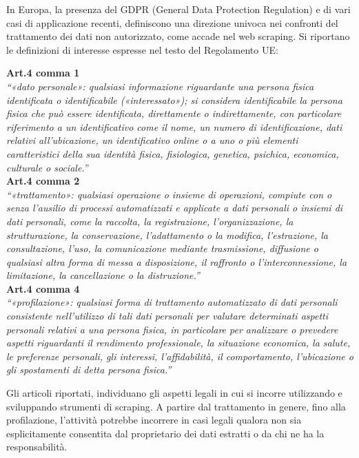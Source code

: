 In Europa, la presenza del GDPR (General Data Protection Regulation)\cite{GDPR} e di vari casi di applicazione recenti, definiscono una direzione univoca nei confronti del trattamento dei dati non autorizzato, come accade nel web scraping.
Si riportano le definizioni di interesse espresse nel testo del Regolamento UE:
\begin{center}
\textbf{Art.4 comma 1}\\
\textit{``«dato personale»: qualsiasi informazione riguardante una persona fisica identificata o
identificabile («interessato»); si considera identificabile la persona fisica che può essere
identificata, direttamente o indirettamente, con particolare riferimento a un identificativo come il
nome, un numero di identificazione, dati relativi all'ubicazione, un identificativo online o a uno o
più elementi caratteristici della sua identità fisica, fisiologica, genetica, psichica, economica,
culturale o sociale.''}\\
\newpage
\textbf{Art.4 comma 2 }\\
\textit{``«trattamento»: qualsiasi operazione o insieme di operazioni, compiute con o senza l'ausilio di
processi automatizzati e applicate a dati personali o insiemi di dati personali, come la raccolta, la
registrazione, l'organizzazione, la strutturazione, la conservazione, l'adattamento o la modifica,
l'estrazione, la consultazione, l'uso, la comunicazione mediante trasmissione, diffusione o qualsiasi
altra forma di messa a disposizione, il raffronto o l'interconnessione, la limitazione, la cancellazione
o la distruzione.''}\\

\textbf{Art.4 comma 4}\\
\textit{``«profilazione»: qualsiasi forma di trattamento automatizzato di dati personali consistente
nell'utilizzo di tali dati personali per valutare determinati aspetti personali relativi a una persona
fisica, in particolare per analizzare o prevedere aspetti riguardanti il rendimento professionale, la
situazione economica, la salute, le preferenze personali, gli interessi, l'affidabilità, il
comportamento, l'ubicazione o gli spostamenti di detta persona fisica.''}
\end{center}

Gli articoli riportati, individuano gli aspetti legali in cui si incorre utilizzando e  sviluppando strumenti di scraping. A partire dal trattamento in genere, fino alla profilazione, l'attivit\`a potrebbe incorrere in casi legali qualora non sia esplicitamente consentita dal proprietario dei dati estratti o da chi ne ha la responsabilit\`a. 

